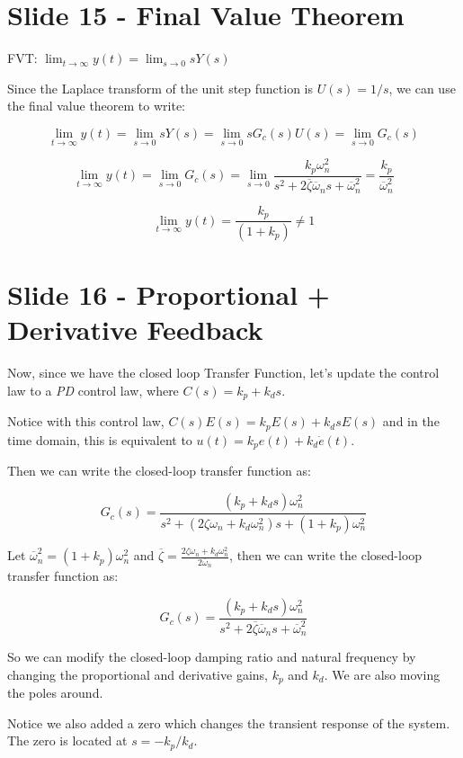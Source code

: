 \documentclass[
  letterpaper,
  DIV=11,
  numbers=noendperiod]{scrreprt}
\begin{document}
\section{Slide 15 - Final Value
Theorem}\label{slide-15---final-value-theorem}

FVT: \(\lim_{t\to\infty} y(t) = \lim_{s\to0} sY(s)\)

Since the Laplace transform of the unit step function is \(U(s) = 1/s\),
we can use the final value theorem to write:

\[ \lim_{t\to\infty} y(t) = \lim_{s\to0} sY(s) = \lim_{s\to0} sG_c(s)U(s) = \lim_{s\to0} G_c(s) \]

\[ \lim_{t\to\infty} y(t) = \lim_{s\to0} G_c(s) = \lim_{s\to0} \frac{k_p\omega_n^2}{s^2 + 2\overline{\zeta}\overline{\omega}_n s + \overline{\omega}_n^2} = \frac{k_p}{\overline{\omega}_n^2}\]

\[ \lim_{t\to\infty} y(t) = \frac{k_p}{(1+k_p)} \ne 1\]

\section{Slide 16 - Proportional + Derivative
Feedback}\label{slide-16---proportional-derivative-feedback}

Now, since we have the closed loop Transfer Function, let's update the
control law to a \emph{PD} control law, where \(C(s) = k_p + k_d s\).

Notice with this control law, \(C(s)E(s) = k_p E(s) + k_d s E(s)\) and
in the time domain, this is equivalent to
\(u(t) = k_p e(t) + k_d \dot{e}(t)\).

Then we can write the closed-loop transfer function as:

\[G_c(s) = \frac{(k_p + k_d s)\omega_n^2}{s^2 + (2\zeta\omega_n + k_d\omega_n^2)s + (1+k_p)\omega_n^2}\]

Let \(\overline{\omega}_n^2 = (1+k_p)\omega_n^2\) and
\(\overline{\zeta} = \frac{2\zeta\omega_n + k_d\omega_n^2}{2\overline{\omega}_n}\),
then we can write the closed-loop transfer function as:

\[G_c(s) = \frac{(k_p + k_d s)\omega_n^2}{s^2 + 2\overline{\zeta}\overline{\omega}_n s + \overline{\omega}_n^2}\]

So we can modify the closed-loop damping ratio and natural frequency by
changing the proportional and derivative gains, \(k_p\) and \(k_d\). We
are also moving the poles around.

Notice we also added a zero which changes the transient response of the
system. The zero is located at \(s = -k_p/k_d\).
\end{document}
